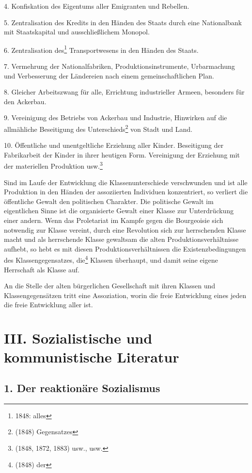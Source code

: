 \documentclass[letterpaper]{article}
\begin{document}
4. Konfiskation des Eigentums aller Emigranten und Rebellen.

5. Zentralisation des Kredits in den Händen des Staats durch eine Nationalbank mit Staatskapital und ausschließlichem Monopol.

6. Zentralisation des\footnote{1848: alles} Transportwesens in den Händen des Staats.

7. Vermehrung der Nationalfabriken, Produktionsinstrumente, Urbarmachung und Verbesserung der Ländereien nach einem gemeinschaftlichen Plan.

8. Gleicher Arbeitszwang für alle, Errichtung industrieller Armeen, besonders für den Ackerbau.

9. Vereinigung des Betriebs von Ackerbau und Industrie, Hinwirken auf die allmähliche Beseitigung des Unterschieds\footnote{(1848) Gegensatzes} von Stadt und Land.

10. Öffentliche und unentgeltliche Erziehung aller Kinder. Beseitigung der Fabrikarbeit der Kinder in ihrer heutigen Form. Vereinigung der Erziehung mit der materiellen Produktion usw.\footnote{(1848, 1872, 1883) usw., usw.}

Sind im Laufe der Entwicklung die Klassenunterschiede verschwunden und ist alle Produktion in den Händen der assoziierten Individuen konzentriert, so verliert die öffentliche Gewalt den politischen Charakter. Die politische Gewalt im eigentlichen Sinne ist die organisierte Gewalt einer Klasse zur Unterdrückung einer andern. Wenn das Proletariat im Kampfe gegen die Bourgeoisie sich notwendig zur Klasse vereint, durch eine Revolution sich zur herrschenden Klasse macht und als herrschende Klasse gewaltsam die alten Produktionsverhältnisse aufhebt, so hebt es mit diesen Produktionsverhältnissen die Existenzbedingungen des Klassengegensatzes, die\footnote{(1848) der} Klassen überhaupt, und damit seine eigene Herrschaft als Klasse auf.

An die Stelle der alten bürgerlichen Gesellschaft mit ihren Klassen und Klassengegensätzen tritt eine Assoziation, worin die freie Entwicklung eines jeden die freie Entwicklung aller ist.

\section{III. Sozialistische und kommunistische Literatur}

\subsection{1. Der reaktionäre Sozialismus}
\end{document}
